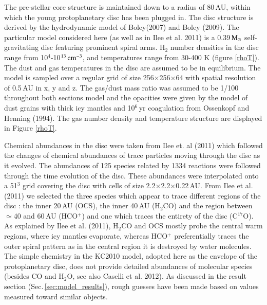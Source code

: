 \documentclass[useAMS,usenatbib]{mn2e}
\begin{document}
The pre-stellar core structure is maintained down to a radius of 80\,AU, within which the young protoplanetary disc has been plugged in. The disc structure is derived by the hydrodynamic model of Boley(2007) and Boley (2009). The particular model considered here (as well as in Ilee et al. 2011) is a 0.39$\,\rm{M}_\odot$ self-gravitating disc featuring prominent spiral arms. H$_2$ number densities in the disc range from 10$^{4}$-10$^{13}\,\rm{cm}^{-3}$, and temperatures range from 30-400 K (figure \ref{rhoT}). The dust and gas temperatures in the disc are assumed to be in equilibrium. The model is sampled over a regular grid of size 256$\times$256$\times$64 with spatial resolution of 0.5$\,$AU in x, y and z. The gas/dust mass ratio was assumed to be 1/100 throughout both sections model and the opacities were given by the model of dust grains with thick icy mantles and 10$^6\,$yr coagulation from Ossenkopf and Henning (1994). The gas number density and temperature structure are displayed in Figure \ref{rhoT}. \newline

Chemical abundances in the disc were taken from Ilee et. al (2011) which followed the changes of chemical abundances of trace particles moving through the disc as it evolved. The abundances of 125 species related by 1334 reactions were followed through the time evolution of the disc. These abundances were interpolated onto a 51$^3$ grid covering the disc with cells of size 2.2$\times$2.2$\times$0.22$\,$AU.  From Ilee et al. (2011) we selected the three species which appear to trace different regions of the disc : the inner 20\,AU (OCS), the inner 40\,AU (H$_2$CO) and the region between $\simeq$40 and 60\,AU (HCO$^+$) and one which traces the entirety of the disc (C$^{17}$O). As explained by Ilee et al. (2011),  H$_2$CO and OCS mostly probe the central warm regions, where icy mantles evaporate, whereas HCO$^+$ preferentially traces the outer spiral pattern as in the central region it is destroyed by water molecules. The simple chemistry in the KC2010 model, adopted here as the envelope of the protoplanetary disc, does not provide detailed abundances of molecular species (besides CO and H$_2$O, see also Caselli et al. 2012). As discussed in the result section (Sec.\,\ref{sec:model_results}), rough guesses have been made based on values measured toward similar objects. 
\end{document}
